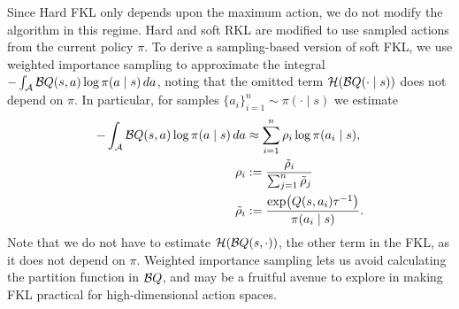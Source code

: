 \documentclass[\main/thesis.tex]{subfiles}
\begin{document}
Since Hard FKL only depends upon the maximum action, we do not modify the algorithm in this regime. Hard and soft RKL are modified to use sampled actions from the current policy $\pi$. To derive a sampling-based version of soft FKL, we use weighted importance sampling to approximate the integral $-\int_{\mathcal{A}} \mathcal{B}Q(s, a) \log \pi(a \mid s)\, da$, noting that the omitted term $\mathcal{H}(\mathcal{B}Q(\cdot \mid s))$ does not depend on $\pi$. In particular, for samples $\{a_i\}_{i = 1}^n \sim \pi(\cdot \mid s)$ we estimate 
\begin{align*}
    -\int_{\mathcal{A}} \mathcal{B}Q(s, a) \log \pi(a \mid s)\, da &\approx \sum_{i = 1}^n \rho_i \log \pi(a_i \mid s) ,\\
    \rho_i &:= \frac{\tilde{\rho}_i}{\sum_{j = 1}^n \tilde{\rho}_j}\\
    \tilde{\rho}_i &:= \frac{\exp(Q(s, a_i) \tau^{-1})}{\pi(a_i \mid s)}. 
\end{align*}
Note that we do not have to estimate $\mathcal{H}(\mathcal{B}Q(s, \cdot))$, the other term in the FKL, as it does not depend on $\pi$. Weighted importance sampling lets us avoid calculating the partition function in $\mathcal{B}Q$, and may be a fruitful avenue to explore in making FKL practical for high-dimensional action spaces. 

  
\end{document}
